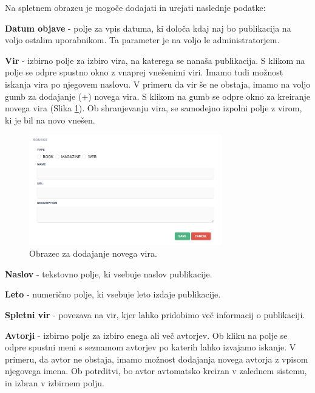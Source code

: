 \documentclass[a4paper, 12pt]{book}
\begin{document}
\clearpage
Na spletnem obrazcu je mogoče dodajati in urejati naslednje podatke:

\begin{description}
    \item \textbf{Datum objave} - polje za vpis datuma, ki določa kdaj naj bo publikacija na voljo ostalim uporabnikom. Ta parameter je na voljo le administratorjem.
    
    \item \textbf{Vir} - izbirno polje za izbiro vira, na katerega se nanaša publikacija. S klikom na polje se odpre spustno okno z vnaprej vnešenimi viri. Imamo tudi možnost iskanja vira po njegovem naslovu. V primeru da vir še ne obstaja, imamo na voljo gumb za dodajanje (+) novega vira. S klikom na gumb se odpre okno za kreiranje novega vira (Slika \ref{add-source}). Ob shranjevanju vira, se samodejno izpolni polje z virom, ki je bil na novo vnešen.
    
    \begin{figure}[h]
        \begin{center}
        \includegraphics[width=0.75\textwidth]{slike/add-source.png}
        \end{center}
        \caption{ Obrazec za dodajanje novega vira. }
        \label{add-source}
    \end{figure}
    
    \item \textbf{Naslov} - tekstovno polje, ki vsebuje naslov publikacije.
    
    \item \textbf{Leto} - numerično polje, ki vsebuje leto izdaje publikacije.
    
    \item \textbf{Spletni vir} - povezava na vir, kjer lahko pridobimo več informacij o publikaciji.
    
    \item \textbf{Avtorji} - izbirno polje za izbiro enega ali več avtorjev. Ob kliku na polje se odpre spustni meni s seznamom avtorjev po katerih lahko izvajamo iskanje. V primeru, da avtor ne obstaja, imamo možnost dodajanja novega avtorja z vpisom njegovega imena. Ob potrditvi, bo avtor avtomatsko kreiran v zalednem sistemu, in izbran v izbirnem polju.
    

\end{description}
\end{document}
